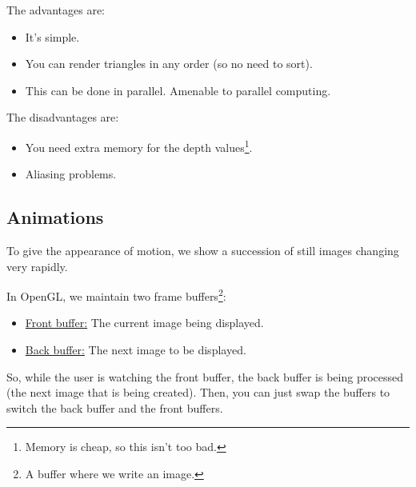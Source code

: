 \documentclass[letterpaper]{article}
\begin{document}
\begin{enumerate}
    The advantages are: 
    \begin{itemize}
        \item It's simple. 
        \item You can render triangles in any order (so no need to sort).
        \item This can be done in parallel. Amenable to parallel computing.
    \end{itemize}

    The disadvantages are: 
    \begin{itemize}
        \item You need extra memory for the depth values\footnote{Memory is cheap, so this isn't too bad.}. 
        \item Aliasing problems.  
    \end{itemize}
\end{enumerate}


\subsection{Animations}
To give the appearance of motion, we show a succession of still images changing very rapidly.

\bigskip 

In OpenGL, we maintain two frame buffers\footnote{A buffer where we write an image.}:
\begin{itemize}
    \item \underline{Front buffer:} The current image being displayed. 
    \item \underline{Back buffer:} The next image to be displayed.  
\end{itemize} 
So, while the user is watching the front buffer, the back buffer is being processed (the next image that is being created). Then, you can just swap the buffers to switch the back buffer and the front buffers. 
\end{document}

